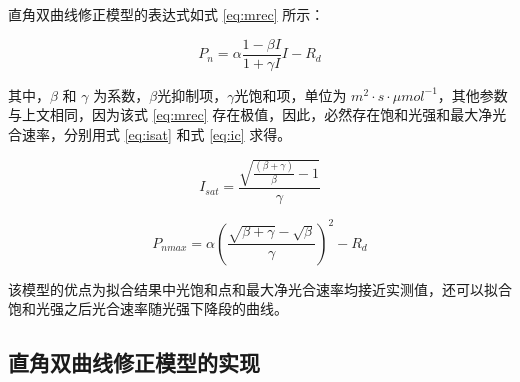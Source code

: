 \documentclass[]{krantz}
\theoremstyle{definition}
\theoremstyle{definition}
\theoremstyle{definition}
\theoremstyle{remark}
\begin{document}
\citet{YEZiPiao2010} 直角双曲线修正模型的表达式如式 \eqref{eq:mrec} 所示：

\begin{equation}
P_{n} = \alpha \frac{1-\beta I}{1+\gamma I} I - R_{d}
\label{eq:mrec}
\end{equation}

其中，\(\beta\) 和 \(\gamma\)
为系数，\(\beta\)光抑制项，\(\gamma\)光饱和项，单位为
\(m^{2}\cdot s\cdot\mu mol^{-1}\)，其他参数与上文相同，因为该式
\eqref{eq:mrec} 存在极值，因此，必然存在饱和光强和最大净光合速率，分别用式
\eqref{eq:isat} 和式 \eqref{eq:ic} 求得。

\begin{equation}
I_{sat} = \frac{\sqrt{\frac{(\beta+\gamma)}{\beta}-1}}{\gamma}
\label{eq:isat}
\end{equation}

\begin{equation}
P_{nmax} = \alpha\left(\frac{\sqrt{\beta+\gamma}-\sqrt{\beta}}{\gamma}\right)^{2}-R_{d}
\label{eq:ic}
\end{equation}

该模型的优点为拟合结果中光饱和点和最大净光合速率均接近实测值，还可以拟合饱和光强之后光合速率随光强下降段的曲线。

\subsection{直角双曲线修正模型的实现}\label{rev_rec_exam}
\end{document}
